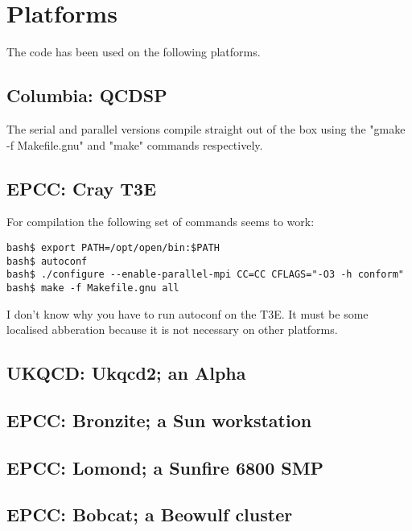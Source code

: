 \documentclass[12pt]{article}
\begin{document}
\section{Platforms}
The code has been used on the following platforms.

\subsection{Columbia: QCDSP}
The serial and parallel versions compile straight out of the box using
the "gmake -f Makefile.gnu" and "make" commands respectively.

\subsection{EPCC: Cray T3E}
For compilation the following set of commands seems to work:
\begin{verbatim}
bash$ export PATH=/opt/open/bin:$PATH
bash$ autoconf
bash$ ./configure --enable-parallel-mpi CC=CC CFLAGS="-O3 -h conform"
bash$ make -f Makefile.gnu all
\end{verbatim}

I don't know why you have to run autoconf on the T3E.  It must be some
localised abberation because it is not necessary on other platforms.

\subsection{UKQCD: Ukqcd2; an Alpha}

\subsection{EPCC: Bronzite; a Sun workstation}

\subsection{EPCC: Lomond; a Sunfire 6800 SMP}

\subsection{EPCC: Bobcat; a Beowulf cluster}
\end{document}
